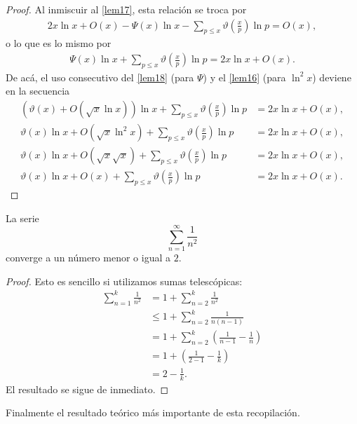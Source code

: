 \begin{proof}
Al inmiscuir al \cref{lem17}, esta relaci\'on se troca por 
\begin{align}
2x\ln x + O(x) - \Psi(x)\ln x - \sum_{p \leq x} \vartheta\left(\frac{x}{p}\right)\ln p = O(x), 
\end{align}
o lo que es lo mismo por 
\begin{align}
\Psi(x)\ln x + \sum_{p \leq x} \vartheta\left(\frac{x}{p}\right)\ln p = 2x\ln x + O(x).
\end{align}
De ac\'a, el uso consecutivo del \cref{lem18} (para $\Psi$) y el \cref{lem16} (para $\ln^2 x$) deviene en la secuencia
\begin{align}
(\vartheta(x) + O(\sqrt{x}\ln x))\ln x + \sum_{p \leq x} \vartheta\left(\frac{x}{p}\right)\ln p &= 2x\ln x + O(x), \\
\vartheta(x)\ln x + O(\sqrt{x}\ln^2 x) + \sum_{p \leq x} \vartheta\left(\frac{x}{p}\right)\ln p &= 2x\ln x + O(x), \\
\vartheta(x)\ln x + O(\sqrt{x}\sqrt{x}) + \sum_{p \leq x} \vartheta\left(\frac{x}{p}\right)\ln p &= 2x\ln x + O(x), \\
\vartheta(x)\ln x + O(x) + \sum_{p \leq x} \vartheta\left(\frac{x}{p}\right)\ln p &= 2x\ln x + O(x).
\end{align}
\end{proof}

\begin{lemma}
La serie
\[
\sum_{n = 1}^\infty \frac{1}{n ^ 2}
\]
converge a un n\'umero menor o igual a $2$. 
\end{lemma}

\begin{proof}
Esto es sencillo si utilizamos sumas telesc\'opicas: 
\begin{align}
\sum_{n = 1}^k \frac{1}{n^2} &= 1 + \sum_{n = 2}^k \frac{1}{n^2} \\
&\leq 1 + \sum_{n = 2}^k \frac{1}{n (n - 1)} \\
&= 1 + \sum_{n = 2}^k \left(\frac{1}{n - 1} - \frac{1}{n}\right) \\
&= 1 + \left(\frac{1}{2 - 1} - \frac{1}{k}\right) \\
&= 2 - \frac{1}{k}.
\end{align}
El resultado se sigue de inmediato. 
\end{proof}

Finalmente el resultado te\'orico m\'as importante de esta recopilaci\'on. 

